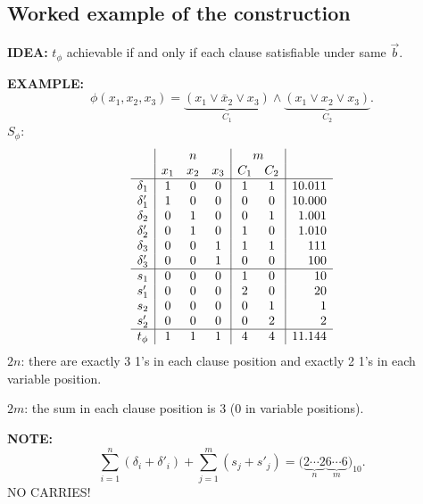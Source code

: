 \subsection{Worked example of the construction}
\textbf{IDEA:} $t_\phi$ achievable if and only if each clause satisfiable under same $\vec b$.

\textbf{EXAMPLE:}
\[\phi(x_1,x_2,x_3)=\underbrace{(x_1\lor\bar x_2\lor x_3)}_{C_1}\land\underbrace{(x_1\lor x_2\lor x_3)}_{C_2}.\]
$S_\phi$:
\[
\begin{array}{c|ccc|cc|r}
 &\multicolumn{3}{c|}{n}&\multicolumn{2}{c|}{m}&\\
 &x_1&x_2&x_3&C_1&C_2&\\\hline
\delta_1&1&0&0&1&1&10.011\\
\delta'_1&1&0&0&0&0&10.000\\
\delta_2&0&1&0&0&1&1.001\\
\delta'_2&0&1&0&1&0&1.010\\
\delta_3&0&0&1&1&1&111\\
\delta'_3&0&0&1&0&0&100\\\hline
s_1&0&0&0&1&0&10\\
s'_1&0&0&0&2&0&20\\
s_2&0&0&0&0&1&1\\
s'_2&0&0&0&0&2&2\\\hline
t_\phi&1&1&1&4&4&11.144
\end{array}
\]
$2n$: there are exactly 3 1's in each clause position and exactly 2 1's in each variable position.

$2m$: the sum in each clause position is 3 (0 in variable positions).

\textbf{NOTE:}
\[\sum_{i=1}^n(\delta_i+\delta'_i)+\sum_{j=1}^m(s_j+s'_j)
=\bigl(\underbrace{2\cdots2}_{n}\underbrace{6\cdots6}_{m}\bigr)_{10}.\]
NO CARRIES!
